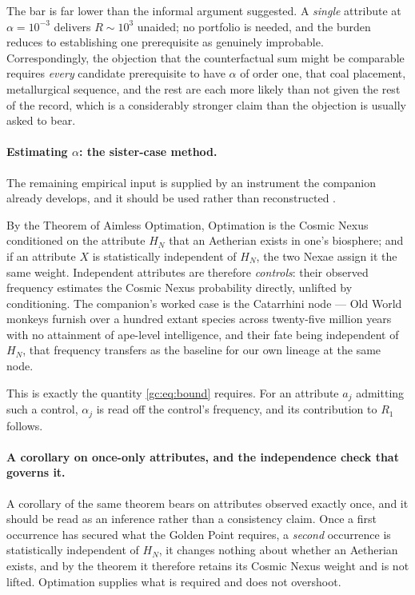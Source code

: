 \documentclass[11pt]{article}
\numberwithin{equation}{section}
\theoremstyle{plain}
\theoremstyle{definition}
\theoremstyle{remark}
\begin{document}
\noindent The bar is far lower than the informal argument suggested. A
\emph{single} attribute at $\alpha=10^{-3}$ delivers $R\sim10^{3}$
unaided; no portfolio is needed, and the burden reduces to establishing
one prerequisite as genuinely improbable. Correspondingly, the objection
that the counterfactual sum might be comparable requires \emph{every}
candidate prerequisite to have $\alpha$ of order one, that coal
placement, metallurgical sequence, and the rest are each more likely
than not given the rest of the record, which is a considerably
stronger claim than the objection is usually asked to bear.

\paragraph{Estimating $\alpha$: the sister-case method.} The remaining
empirical input is supplied by an instrument the companion already
develops, and it should be used rather than reconstructed
\cite{Nexus}.

By the Theorem of Aimless Optimation, Optimation is the Cosmic Nexus
conditioned on the attribute $H_N$ that an Aetherian exists in one's
biosphere; and if an attribute $X$ is statistically independent of
$H_N$, the two Nexae assign it the same weight. Independent attributes
are therefore \emph{controls}: their observed frequency estimates the
Cosmic Nexus probability directly, unlifted by conditioning. The
companion's worked case is the Catarrhini node --- Old World monkeys
furnish over a hundred extant species across twenty-five million years
with no attainment of ape-level intelligence, and their fate being
independent of $H_N$, that frequency transfers as the baseline for our
own lineage at the same node.

This is exactly the quantity \eqref{gc:eq:bound} requires. For an
attribute $a_j$ admitting such a control, $\alpha_j$ is read off the
control's frequency, and its contribution to $R_1$ follows.

\paragraph{A corollary on once-only attributes, and the independence
check that governs it.}\label{gc:rem:onceonly}
A corollary of the same theorem bears on attributes observed exactly
once, and it should be read as an inference rather than a
consistency claim. Once a first occurrence has secured what the Golden
Point requires, a \emph{second} occurrence is statistically independent
of $H_N$, it changes nothing about whether an Aetherian exists, and by the theorem it therefore retains its Cosmic Nexus weight and is
not lifted. Optimation supplies what is required and does not
overshoot.
\end{document}

